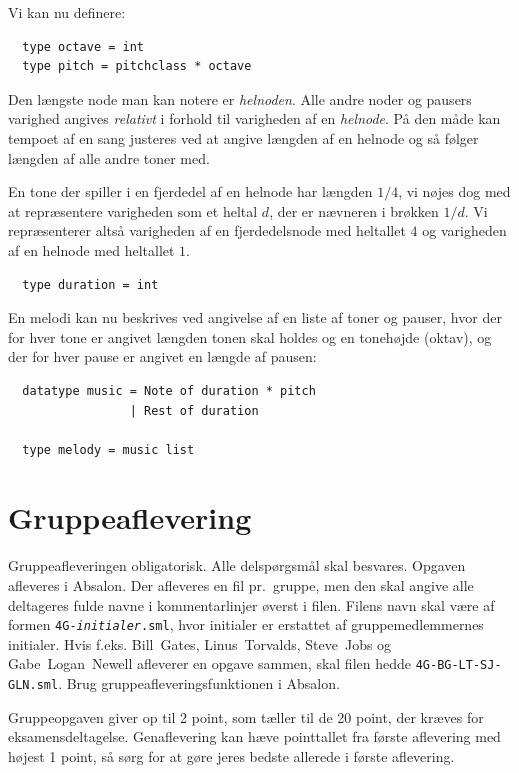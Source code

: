 \documentclass[a4paper,12pt]{article}
\begin{document}
Vi kan nu definere:
\begin{lstlisting}
  type octave = int
  type pitch = pitchclass * octave
\end{lstlisting}

Den længste node man kan notere er \textit{helnoden}. Alle andre noder
og pausers varighed angives \textit{relativt} i forhold til varigheden
af en \textit{helnode}. På den måde kan tempoet af en sang justeres ved at angive
længden af en helnode og så følger længden af alle andre toner med. 

En tone der spiller i en fjerdedel af en helnode har længden $1/4$, vi
nøjes dog med at repræsentere varigheden som et heltal $d$, der er
nævneren i brøkken $1/d$. Vi repræsenterer altså varigheden af en
fjerdedelsnode med heltallet $4$ og varigheden af en helnode med
heltallet $1$.
\begin{lstlisting}
  type duration = int
\end{lstlisting}

En melodi kan nu beskrives ved angivelse af en liste af toner og
pauser, hvor der for hver tone er angivet længden tonen skal holdes og
en tonehøjde (oktav), og der for hver pause er angivet en længde af
pausen:
\begin{lstlisting}
  datatype music = Note of duration * pitch
                 | Rest of duration

  type melody = music list
\end{lstlisting}

\section{Gruppeaflevering}
\label{sec:gruppeaflevering}
Gruppeafleveringen obligatorisk.  Alle delspørgsmål skal besvares.
Opgaven afleveres i Absalon.  Der afleveres en fil pr.\ gruppe, men
den skal angive alle deltageres fulde navne i kommentarlinjer øverst i
filen. Filens navn skal være af formen
\texttt{4G-\textit{initialer}.sml}, hvor initialer er erstattet af
gruppemedlemmernes initialer. Hvis f.eks. Bill~Gates, Linus~Torvalds,
Steve~Jobs og Gabe~Logan~Newell afleverer en opgave sammen, skal filen
hedde \texttt{4G-BG-LT-SJ-GLN.sml}. Brug gruppeafleveringsfunktionen i
Absalon.

Gruppeopgaven giver op til 2 point, som tæller til de 20 point, der
kræves for eksamensdeltagelse.  Genaflevering kan hæve pointtallet fra
første aflevering med højest 1 point, så sørg for at gøre jeres bedste
allerede i første aflevering.
\end{document}
